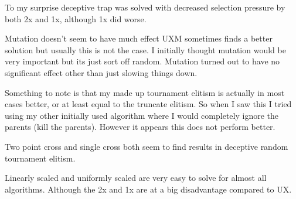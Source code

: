\documentclass{article}
\begin{document}
\begin{empfile}
To my surprise deceptive trap was solved with decreased selection pressure
by both 2x and 1x, although 1x did worse. 

Mutation doesn't seem to have much effect UXM sometimes finds a better
solution but usually this is not the case. I initially thought mutation
would be very important but its just sort off random.  Mutation turned out
to have no significant effect other than just slowing things down.

Something to note is that my made up tournament elitism is actually in most
cases better, or at least equal to the truncate elitism. So when I saw
this I tried using my other initially used algorithm where I would completely
ignore the parents (kill the parents). However it appears this does not
perform better.

Two point cross and single cross both seem to find results in deceptive
random tournament elitism.

Linearly scaled and uniformly scaled are very easy to solve for almost all
algorithms. Although the 2x and 1x are at a big disadvantage compared to UX.

\end{empfile}
\end{document}
